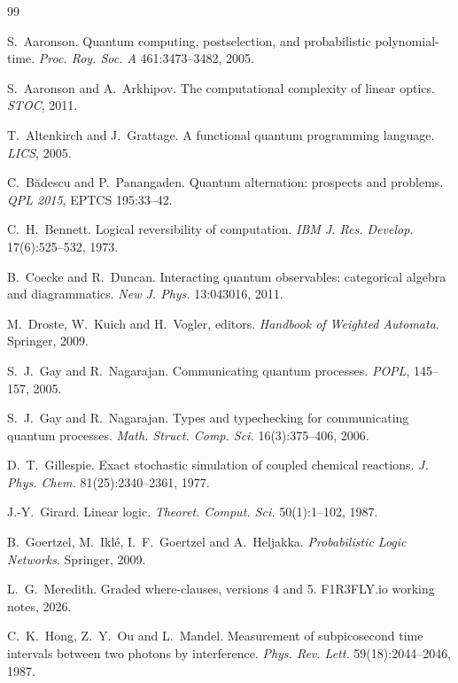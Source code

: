 \documentclass[11pt,a4paper]{article}
\theoremstyle{plain}
\theoremstyle{definition}
\theoremstyle{remark}
\begin{document}
\begin{thebibliography}{99}\small

 S.~Aaronson.
Quantum computing, postselection, and probabilistic polynomial-time.
\emph{Proc. Roy. Soc. A} 461:3473--3482, 2005.

 S.~Aaronson and A.~Arkhipov.
The computational complexity of linear optics. \emph{STOC}, 2011.

 T.~Altenkirch and J.~Grattage.
A functional quantum programming language. \emph{LICS}, 2005.

 C.~B\u{a}descu and P.~Panangaden.
Quantum alternation: prospects and problems.
\emph{QPL 2015}, EPTCS 195:33--42.

 C.~H.~Bennett.
Logical reversibility of computation.
\emph{IBM J. Res. Develop.} 17(6):525--532, 1973.

 B.~Coecke and R.~Duncan.
Interacting quantum observables: categorical algebra and diagrammatics.
\emph{New J. Phys.} 13:043016, 2011.

 M.~Droste, W.~Kuich and H.~Vogler, editors.
\emph{Handbook of Weighted Automata}. Springer, 2009.

 S.~J.~Gay and R.~Nagarajan.
Communicating quantum processes. \emph{POPL}, 145--157, 2005.

 S.~J.~Gay and R.~Nagarajan.
Types and typechecking for communicating quantum processes.
\emph{Math. Struct. Comp. Sci.} 16(3):375--406, 2006.

 D.~T.~Gillespie.
Exact stochastic simulation of coupled chemical reactions.
\emph{J. Phys. Chem.} 81(25):2340--2361, 1977.

 J.-Y.~Girard.
Linear logic. \emph{Theoret. Comput. Sci.} 50(1):1--102, 1987.

 B.~Goertzel, M.~Ikl\'e, I.~F.~Goertzel and A.~Heljakka.
\emph{Probabilistic Logic Networks}. Springer, 2009.

 L.~G.~Meredith.
Graded where-clauses, versions 4 and 5. F1R3FLY.io working notes, 2026.

 C.~K.~Hong, Z.~Y.~Ou and L.~Mandel.
Measurement of subpicosecond time intervals between two photons by
interference. \emph{Phys. Rev. Lett.} 59(18):2044--2046, 1987.


\end{thebibliography}
\end{document}
